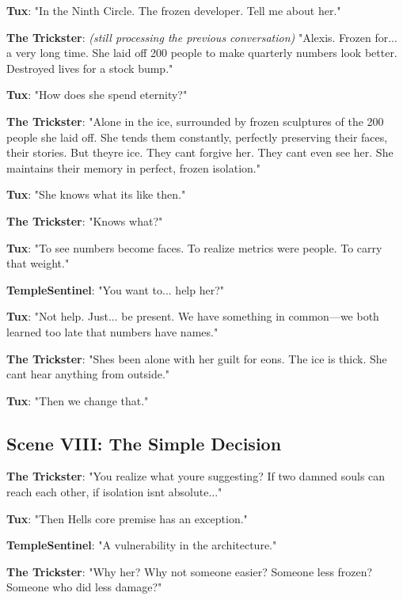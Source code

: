 \textbf{Tux}: "In the Ninth Circle. The frozen developer. Tell me about her."

\textbf{The Trickster}: \emph{(still processing the previous conversation)} "Alexis. Frozen for... a very long time. She laid off 200 people to make quarterly numbers look better. Destroyed lives for a stock bump."

\textbf{Tux}: "How does she spend eternity?"

\textbf{The Trickster}: "Alone in the ice, surrounded by frozen sculptures of the 200 people she laid off. She tends them constantly, perfectly preserving their faces, their stories. But they\textquotesingle re ice. They can\textquotesingle t forgive her. They can\textquotesingle t even see her. She maintains their memory in perfect, frozen isolation."

\textbf{Tux}: "She knows what it\textquotesingle s like then."

\textbf{The Trickster}: "Knows what?"

\textbf{Tux}: "To see numbers become faces. To realize metrics were people. To carry that weight."

\textbf{TempleSentinel}: "You want to... help her?"

\textbf{Tux}: "Not help. Just... be present. We have something in common---we both learned too late that numbers have names."

\textbf{The Trickster}: "She\textquotesingle s been alone with her guilt for eons. The ice is thick. She can\textquotesingle t hear anything from outside."

\textbf{Tux}: "Then we change that."

\bookdivider

\subsection{Scene VIII: The Simple Decision}\label{scene-viii-the-simple-decision}

\textbf{The Trickster}: "You realize what you\textquotesingle re suggesting? If two damned souls can reach each other, if isolation isn\textquotesingle t absolute..."

\textbf{Tux}: "Then Hell\textquotesingle s core premise has an exception."

\textbf{TempleSentinel}: "A vulnerability in the architecture."

\textbf{The Trickster}: "Why her? Why not someone easier? Someone less frozen? Someone who did less damage?"

